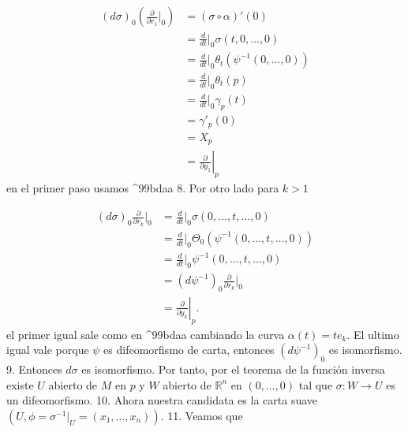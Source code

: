 \begin{bookproof}{}
\[
\begin{aligned}(d\sigma)_0\left(\frac{\partial}{\partial r_1}\bigg|_0\right)&=(\sigma\circ\alpha )'(0)\\&=\frac{d}{dt}\bigg|_0\sigma(t,0,\dots,0)\\&=\frac{d}{dt}\bigg|_0\theta_t(\psi^{-1}(0,\dots,0))\\&=\frac{d}{dt}\bigg|_0\theta_t(p)\\&=\frac{d}{dt}\bigg|_0\gamma_{p}(t)\\&=\gamma'_{p}(0)\\&=X_{p}\\&=\left.\frac{\partial}{\partial y_1}\right|_p\end{aligned}
\]
en el primer paso usamos \textasciicircum{}99bdaa 8. Por otro lado para $k>1$

\[
\begin{aligned}(d\sigma)_0\frac{\partial}{\partial r_k}\bigg|_0 &=\frac{d}{dt}\bigg|_0\sigma(0,\ldots,t,\ldots,0)\\ &=\frac{d}{dt}\bigg|_0\Theta_{0}\left(\psi^{-1}(0,\ldots,t,\ldots,0)\right)\\ &=\frac{d}{dt}\bigg|_0\psi^{-1}(0,\ldots,t,\ldots,0)\\ &=(d\psi^{-1})_0\frac{\partial}{\partial r_k}\bigg|_0\\ &=\left.\frac{\partial}{\partial y_k}\right|_p. \end{aligned}
\]
el primer igual sale como en \textasciicircum{}99bdaa cambiando la curva $\alpha(t)=te_{k}$. El ultimo igual vale porque $\psi$ es difeomorfismo de carta, entonces $(d\psi^{-1})_0$ es isomorfismo. 9. Entonces $d\sigma$ es isomorfismo. Por tanto, por el teorema de la función inversa existe $U$ abierto de $M$ en $p$ y $W$ abierto de $\mathbb R^n$ en $(0,\dots,0)$ tal que $\sigma:W\to U$ es un difeomorfismo. 10. Ahora nuestra candidata es la carta suave $(U,\phi=\sigma^{-1}|_U=(x_1,\dots,x_n)).$ 11. Veamos que


\end{bookproof}
